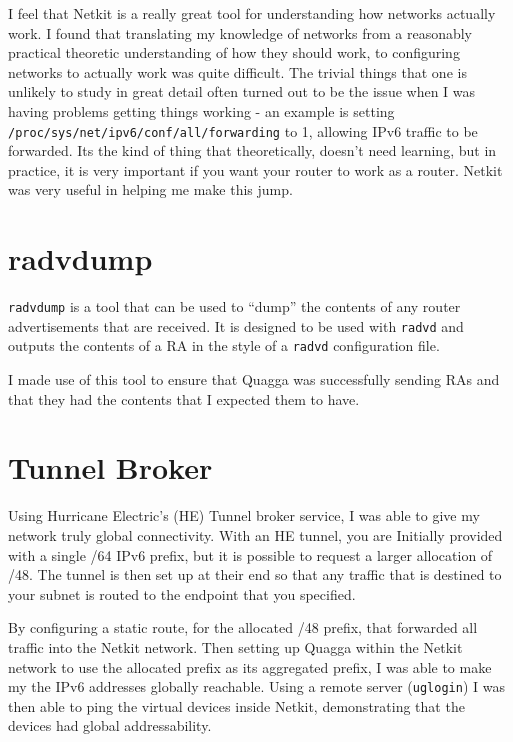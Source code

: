 \documentclass[12pt]{report}
\begin{document}
I feel that Netkit is a really great tool for understanding how networks
actually work. I found that translating my knowledge of networks from a
reasonably practical theoretic understanding of how they should work, to
configuring networks to actually work was quite difficult. The trivial things
that one is unlikely to study in great detail often turned out to be the issue
when I was having problems getting things working - an example is setting
\texttt{/proc/sys/net/ipv6/conf/all/forwarding} to 1, allowing IPv6 traffic to
be forwarded. Its the kind of thing that theoretically,  doesn't need learning,
but in practice, it is very important if you want your router to work as a
router. Netkit was very useful in helping me make this jump. 


\section{radvdump}
\texttt{radvdump} is a tool that can be used to ``dump'' the contents of any
router advertisements that are received. It is designed to be used with
\texttt{radvd} and outputs the contents of a RA in the style of a
\texttt{radvd} configuration file. 

I made use of this tool to ensure that Quagga was successfully sending RAs and
that they had the contents that I expected them to have. 


\section{Tunnel Broker}
Using Hurricane Electric's (HE) Tunnel broker service, I was able to give my
network truly global connectivity. With an HE tunnel, you are Initially
provided with a single /64 IPv6 prefix, but it is possible to request a larger
allocation of /48. The tunnel is then set up at their end so that any traffic
that is destined to your subnet is routed to the endpoint that you specified.  

By configuring a static route, for the allocated /48 prefix, that forwarded all
traffic into the Netkit network. Then setting up Quagga within the Netkit
network to use the allocated prefix as its aggregated prefix, I was able to
make my the IPv6 addresses globally reachable. Using a remote server
(\texttt{uglogin}) I was then able to ping the virtual devices inside Netkit,
demonstrating that the devices had global addressability.
\end{document}
